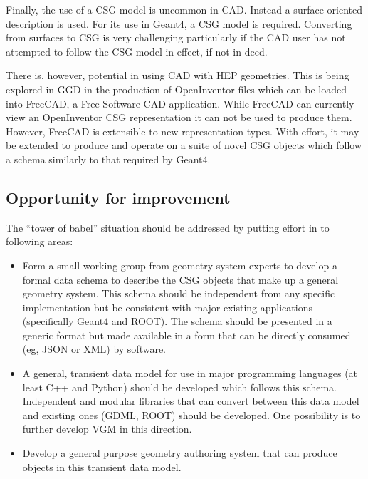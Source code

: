 Finally, the use of a CSG model is uncommon in CAD.  Instead a
surface-oriented description is used.  For its use in Geant4, a CSG
model is required.  Converting from surfaces to CSG is very
challenging particularly if the CAD user has not attempted to follow
the CSG model in effect, if not in deed.

There is, however, potential in using CAD with HEP geometries.  This
is being explored in GGD in the production of OpenInventor files which
can be loaded into FreeCAD, a Free Software CAD application.  While
FreeCAD can currently view an OpenInventor CSG representation it can
not be used to produce them.  However, FreeCAD is extensible to new
representation types.  With effort, it may be extended to produce and
operate on a suite of novel CSG objects which follow a schema
similarly to that required by Geant4.


\subsection{Opportunity for improvement}

The ``tower of babel'' situation should be addressed by putting effort
in to following areas:

\begin{itemize}
\item Form a small working group from geometry system experts to
  develop a formal data schema to describe the CSG objects that make
  up a general geometry system.  This schema should be independent
  from any specific implementation but be consistent with major
  existing applications (specifically Geant4 and ROOT).  The schema
  should be presented in a generic format but made available in a form
  that can be directly consumed (eg, JSON or XML) by software.
\item A general, transient data model for use in major programming
  languages (at least C++ and Python) should be developed which
  follows this schema.  Independent and modular libraries that can
  convert between this data model and existing ones (GDML, ROOT)
  should be developed.  One possibility is to further develop VGM in
  this direction.
\item Develop a general purpose geometry authoring system that can
  produce objects in this transient data model.
\end{itemize}


